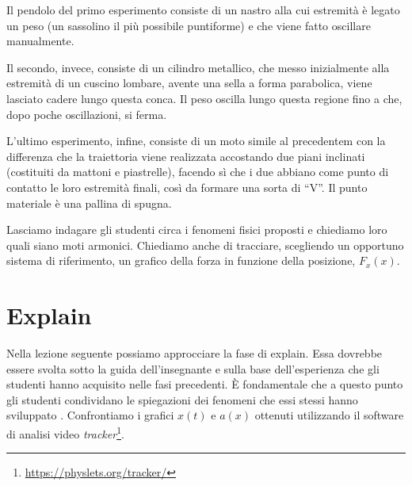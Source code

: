 \documentclass{article}
\begin{document}
Il pendolo del primo esperimento consiste di un nastro alla cui estremità è legato un peso (un
sassolino il più possibile puntiforme) e che viene fatto oscillare manualmente.

Il secondo, invece, consiste di un cilindro metallico, che messo inizialmente alla estremità di un cuscino
lombare, avente una sella a forma parabolica, viene lasciato cadere lungo questa conca. Il peso oscilla
lungo questa regione fino a che, dopo poche oscillazioni, si ferma.

L'ultimo esperimento, infine, consiste di un moto simile al precedentem con la differenza che la traiettoria
viene realizzata accostando due piani inclinati (costituiti da mattoni e piastrelle), facendo sì che i due
abbiano come punto di contatto le loro estremità finali, così da formare una sorta di “V”. Il punto
materiale è una pallina di spugna.

Lasciamo indagare gli studenti circa i fenomeni fisici proposti e chiediamo loro quali siano
moti armonici. Chiediamo anche di tracciare, scegliendo un opportuno sistema di riferimento, un grafico della forza in
funzione della posizione, $F_x(x)$\cite{barbieri2015good}.

\section{Explain}
Nella lezione seguente possiamo approcciare la fase di explain.
Essa dovrebbe essere svolta sotto la guida dell'insegnante e 
sulla base dell'esperienza che gli studenti hanno acquisito nelle
fasi precedenti. \`E fondamentale che a questo punto gli studenti
condividano le spiegazioni dei fenomeni che essi stessi
hanno sviluppato \cite{duran20045e}.
Confrontiamo i grafici $x(t)$ e $a(x)$ ottenuti utilizzando il software di
analisi video \emph{tracker}\footnote{\url{https://physlets.org/tracker/}}.
\end{document}
